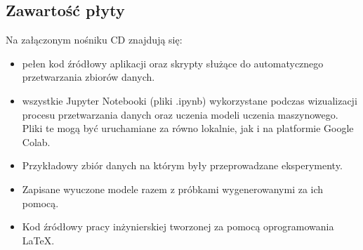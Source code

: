 \begin{appendices}

\chapter{Zawartość płyty}
{
    Na załączonym nośniku CD znajdują się:

    \begin{itemize}
        \setlength\itemsep{-0.5em}
        \item pełen kod źródłowy aplikacji oraz skrypty służące do automatycznego przetwarzania zbiorów danych.
        \item wszystkie Jupyter Notebooki (pliki .ipynb) wykorzystane podczas wizualizacji procesu przetwarzania danych oraz uczenia modeli uczenia maszynowego. Pliki te mogą być uruchamiane za równo lokalnie, jak i na platformie Google Colab.
        \item Przykładowy zbiór danych na którym były przeprowadzane eksperymenty.
        \item Zapisane wyuczone modele razem z próbkami wygenerowanymi za ich pomocą.
        \item Kod źródłowy pracy inżynierskiej tworzonej za pomocą oprogramowania LaTeX.
    \end{itemize}
}

\end{appendices}